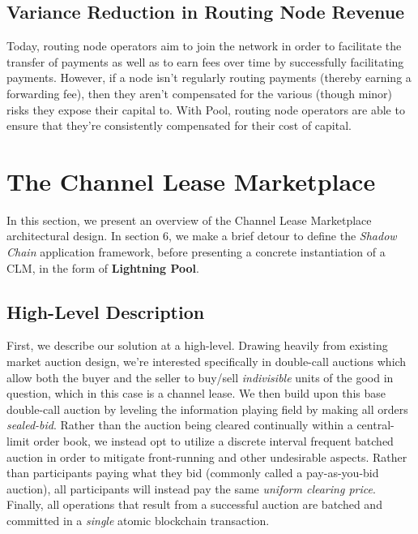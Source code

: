 \documentclass[10pt,a4paper]{article}
\theoremstyle{definition}
\begin{document}
\subsection{Variance Reduction in Routing Node Revenue}

Today, routing node operators aim to join the network in order to facilitate the
transfer of payments as well as to earn fees over time by successfully facilitating
payments. However, if a node isn't regularly routing payments (thereby earning
a forwarding fee), then they aren't compensated for the various (though minor)
risks they expose their capital to. With Pool, routing node operators are able
to ensure that they're consistently compensated for their cost of capital.

\section{The Channel Lease Marketplace} %

In this section, we present an overview of the Channel Lease Marketplace
architectural design. In section 6, we make a brief detour to define the
\emph{Shadow Chain} application framework, before presenting a concrete
instantiation of a CLM, in the form of \textbf{Lightning Pool}.

\subsection{High-Level Description}

First, we describe our solution at a high-level. Drawing heavily from existing
market auction design, we're interested specifically in double-call auctions
which allow both the buyer and the seller to buy/sell \emph{indivisible} units
of the good in question, which in this case is a channel lease. We then build
upon this base double-call auction by leveling the information playing field
\cite{milgromSealedBid} by making all orders \emph{sealed-bid}. Rather than the
auction being cleared continually within a central-limit order book, we instead
opt to utilize a discrete interval frequent batched auction in order to
mitigate front-running and other undesirable aspects. Rather than participants
paying what they bid (commonly called a pay-as-you-bid auction), all
participants will instead pay the same \emph{uniform clearing price}.  Finally,
all operations that result from a successful auction are batched and committed
in a \emph{single} atomic blockchain transaction.
\end{document}
